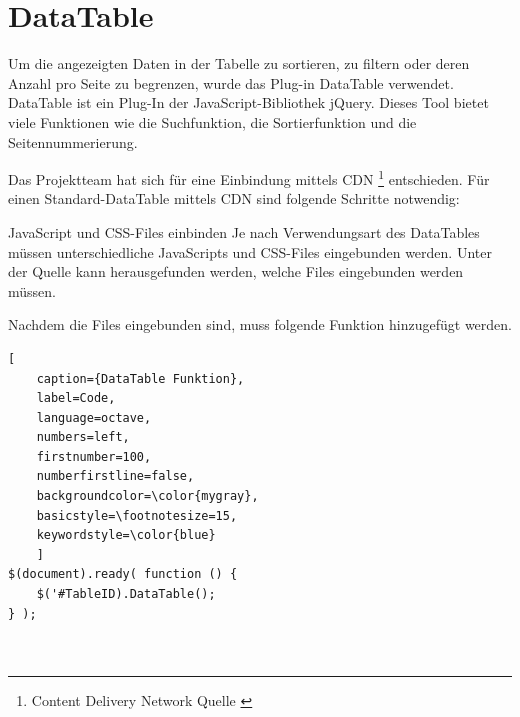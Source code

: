 \section{DataTable} \label{sec:DataTable}
Um die angezeigten Daten in der Tabelle zu sortieren, zu filtern oder deren Anzahl pro Seite zu begrenzen, wurde das Plug-in DataTable verwendet. DataTable ist ein Plug-In der JavaScript-Bibliothek jQuery. Dieses Tool bietet viele Funktionen wie die Suchfunktion, die Sortierfunktion und die Seitennummerierung. 

Das Projektteam hat sich für eine Einbindung mittels CDN \footnote{Content Delivery Network Quelle \cite{DataTableCDN}}  entschieden.
Für einen Standard-DataTable mittels CDN sind folgende Schritte notwendig:

JavaScript und CSS-Files einbinden
\newline Je nach Verwendungsart des DataTables müssen unterschiedliche JavaScripts und CSS-Files eingebunden werden. Unter der  Quelle \cite{DataTable2} kann herausgefunden werden, welche Files eingebunden werden müssen. 

Nachdem die Files eingebunden sind, muss folgende Funktion hinzugefügt werden.
\renewcommand{\lstlistingname}{Quellcode}

\begin{lstlisting}[
	caption={DataTable Funktion},
	label=Code,
	language=octave,
	numbers=left,
	firstnumber=100,
	numberfirstline=false,
	backgroundcolor=\color{mygray},
	basicstyle=\footnotesize=15,
	keywordstyle=\color{blue}
	]
$(document).ready( function () {
	$('#TableID).DataTable();
} );

	
\end{lstlisting}

